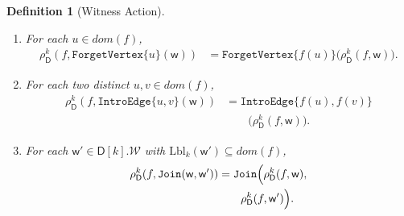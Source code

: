 \documentclass[10pt,a4paper]{amsart}
\newtheorem{definition}{Definition}
\newcommand{\action}{\rho}
\newcommand{\allwitnesses}{\mathcal{W}}
\newcommand{\awitness}{\mathsf{w}}
\newcommand{\domain}{dom}
\newcommand{\dpcore}{\mathsf{D}}
\newcommand{\forgetvertextype}[1]{\mathtt{ForgetVertex}\{#1\}}
\newcommand{\introedgegeneric}[2]{\mathtt{IntroEdge}\{#1,#2\}}
\newcommand{\jointype}{\mathtt{Join}}
\newcommand{\relabelingfunction}{f}
\newcommand{\treewidthvalue}{k}
\newcommand{\vertexone}{u}
\newcommand{\vertextwo}{v}
\begin{document}
\begin{definition}[Witness Action]
\begin{enumerate}
\begin{enumerate}
		    \item \label{condition:relabeldpcore-condition-five}
				    For each $\vertexone\in \domain(\relabelingfunction)$,
				    \[
				    \begin{aligned}
				    \action_{\dpcore}^{\treewidthvalue}(\relabelingfunction,\forgetvertextype{\vertexone}(\awitness))
				    &=
				    \forgetvertextype{\relabelingfunction(\vertexone)}\bigl(\action_{\dpcore}^{\treewidthvalue}(\relabelingfunction,\awitness)\bigr).
				    \end{aligned}
				    \]
		    \item \label{condition:relabeldpcore-condition-six}
				    For each two distinct $\vertexone,\vertextwo\in \domain(\relabelingfunction)$,
				    \[
				    \begin{aligned}
				    \action_{\dpcore}^{\treewidthvalue}(\relabelingfunction,\introedgegeneric{\vertexone}{\vertextwo}(\awitness))
				    &=
				    \introedgegeneric{\relabelingfunction(\vertexone)}{\relabelingfunction(\vertextwo)}\\
				    &\qquad\bigl(\action_{\dpcore}^{\treewidthvalue}(\relabelingfunction,\awitness)\bigr).
				    \end{aligned}
				    \]
	    \item \label{condition:relabeldpcore-condition-seven}
				    For each $\awitness'\in  \dpcore[\treewidthvalue].\allwitnesses$ with $\mathrm{Lbl}_{\treewidthvalue}(\awitness')\subseteq \domain(\relabelingfunction)$,
				    \[
				    \begin{aligned}
				    \action_{\dpcore}^{\treewidthvalue}(\relabelingfunction,\jointype(\awitness,\awitness'))
				    &=
				    \jointype\Bigl(\action_{\dpcore}^{\treewidthvalue}(\relabelingfunction,\awitness),\\
				    &\qquad\action_{\dpcore}^{\treewidthvalue}(\relabelingfunction,\awitness')\Bigr).
				    \end{aligned}
				    \]
			    \end{enumerate}
\end{enumerate}
\end{definition}
\end{document}
